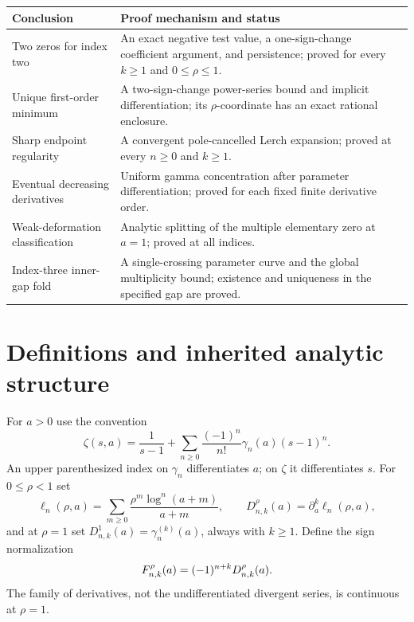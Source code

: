 \begin{center}\small
\begin{tabularx}{\linewidth}{@{}p{.26\linewidth}X@{}}
\toprule
Conclusion & Proof mechanism and status\\\midrule
Two zeros for index two & An exact negative test value, a one-sign-change coefficient argument, and persistence; proved for every $k\ge1$ and $0\le\rho\le1$.\\
Unique first-order minimum & A two-sign-change power-series bound and implicit differentiation; its $\rho$-coordinate has an exact rational enclosure.\\
Sharp endpoint regularity & A convergent pole-cancelled Lerch expansion; proved at every $n\ge0$ and $k\ge1$.\\
Eventual decreasing derivatives & Uniform gamma concentration after parameter differentiation; proved for each fixed finite derivative order.\\
Weak-deformation classification & Analytic splitting of the multiple elementary zero at $a=1$; proved at all indices.\\
Index-three inner-gap fold & A single-crossing parameter curve and the global multiplicity bound; existence and uniqueness in the specified gap are proved.\\\bottomrule
\end{tabularx}
\end{center}

\section{Definitions and inherited analytic structure}\label{lerchbd:sec:structure}
For $a>0$ use the convention
\begin{equation}\label{lerchbd:eq:laurent}
 \zeta(s,a)=\frac1{s-1}+\sum_{n\ge0}\frac{(-1)^n}{n!}\gamma_n(a)(s-1)^n.
\end{equation}
An upper parenthesized index on $\gamma_n$ differentiates $a$; on $\zeta$ it differentiates $s$. For $0\le\rho<1$ set
\[
 \ell_n(\rho,a)=\sum_{m\ge0}\frac{\rho^m\log^n(a+m)}{a+m},
 \qquad
 D_{n,k}^{\rho}(a)=\partial_a^k\ell_n(\rho,a),
\]
and at $\rho=1$ set $D_{n,k}^{1}(a)=\gamma_n^{(k)}(a)$, always with $k\ge1$. Define the sign normalization
\begin{equation}\label{lerchbd:eq:F}
 F_{n,k}^{\rho}(a)=(-1)^{n+k}D_{n,k}^{\rho}(a).
\end{equation}
The family of derivatives, not the undifferentiated divergent series, is continuous at $\rho=1$.

